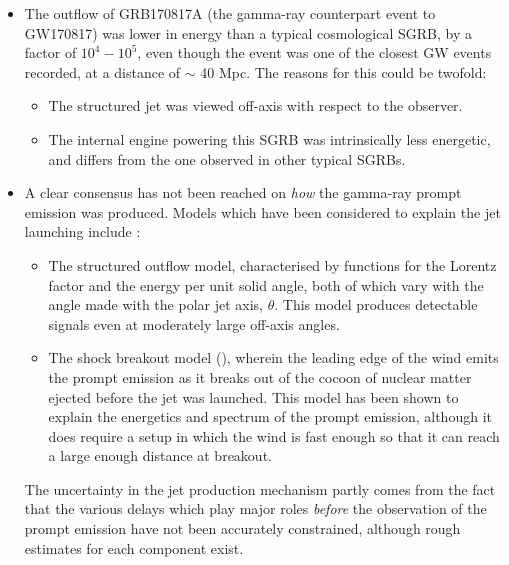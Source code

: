    \begin{itemize}

        \item The outflow of GRB170817A (the gamma-ray counterpart event to GW170817)
            was lower in energy than a typical cosmological SGRB, by a factor of $10^4 -
            10^5$, even though the event was one of the closest GW events recorded, at a
            distance of $\sim$ 40 Mpc. The reasons for this could be twofold:

            \begin{itemize}

                \item The structured jet was viewed off-axis with respect to the
                    observer.

                \item The internal engine powering this SGRB was intrinsically less
                    energetic, and differs from the one observed in other typical SGRBs.

            \end{itemize}

        \item A clear consensus has not been reached on \emph{how} the gamma-ray prompt
            emission was produced. Models which have been considered to explain the jet
            launching include :

            \begin{itemize}

                \item The structured outflow model, characterised by functions for the
                    Lorentz factor and the energy per unit solid angle, both of which
                    vary with the angle made with the polar jet axis, $\theta$. This
                    model produces detectable signals even at moderately large off-axis
                    angles.

                \item The shock breakout model (\cite{gottlieb_2018}), wherein the
                    leading edge of the wind emits the prompt emission as it breaks out
                    of the cocoon of nuclear matter ejected before the jet was launched.
                    This model has been shown to explain the energetics and spectrum of
                    the prompt emission, although it does require a setup in which the
                    wind is fast enough so that it can reach a large enough distance at
                    breakout.

            \end{itemize}

            The uncertainty in the jet production mechanism partly comes from the fact
            that the various delays which play major roles \emph{before} the observation
            of the prompt emission have not been accurately constrained, although rough
            estimates for each component exist.

    \end{itemize}

